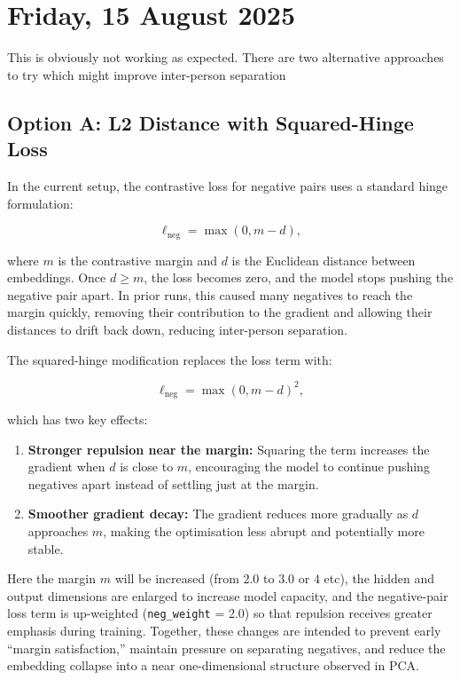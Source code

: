 \section[2025/08/15]{Friday, 15 August 2025}
\label{sec:20250815}

This is obviously not working as expected. There are two alternative approaches to try which might improve 
inter-person separation

\subsection{Option A: L2 Distance with Squared-Hinge Loss} In the current
setup, the contrastive loss for negative pairs uses a standard hinge
formulation:

\[
\ell_{\text{neg}} = \max(0, m - d),
\]

where \(m\) is the contrastive margin and \(d\) is the Euclidean distance
between embeddings. Once \(d \geq m\), the loss becomes zero, and the model
stops pushing the negative pair apart. In prior runs, this caused many
negatives to reach the margin quickly, removing their contribution to the
gradient and allowing their distances to drift back down, reducing inter-person
separation.

The squared-hinge modification replaces the loss term with:

\[
\ell_{\text{neg}} = \max(0, m - d)^2,
\]

which has two key effects:

\begin{enumerate}
    \item \textbf{Stronger repulsion near the margin:} Squaring the term increases the gradient when \(d\) is close to \(m\), encouraging the model to continue pushing negatives apart instead of settling just at the margin.
    \item \textbf{Smoother gradient decay:} The gradient reduces more gradually as \(d\) approaches \(m\), making the optimisation less abrupt and potentially more stable.
\end{enumerate}

Here the margin \(m\) will be increased (from $2.0$ to $3.0$ or $4$ etc), the
hidden and output dimensions are enlarged to increase model capacity, and the
negative-pair loss term is up-weighted (\texttt{neg\_weight} = 2.0) so that
repulsion receives greater emphasis during training. Together, these changes
are intended to prevent early “margin satisfaction,” maintain pressure on
separating negatives, and reduce the embedding collapse into a near
one-dimensional structure observed in PCA.


